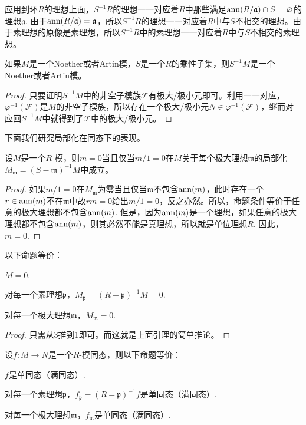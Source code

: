 应用到环$R$的理想上面，$S^{-1}R$的理想一一对应着$R$中那些满足$\operatorname{ann}(R/\mathfrak{a})\cap S=\varnothing$的理想$\mathfrak{a}$. 由于$\operatorname{ann}(R/\mathfrak{a})=\mathfrak{a}$，所以$S^{-1}R$的理想一一对应着$R$中与$S$不相交的理想。由于素理想的原像是素理想，所以$S^{-1}R$中的素理想一一对应着$R$中与$S$不相交的素理想。

\begin{pro}
如果$M$是一个Noether或者Artin模，$S$是一个$R$的乘性子集，则$S^{-1}M$是一个Noether或者Artin模。
\end{pro}

\begin{proof}
	只要证明$S^{-1}M$中的非空子模族$\mathcal{F}$有极大/极小元即可。利用一一对应，$\varphi^{-1}(\mathcal{F})$是$M$的非空子模族，所以存在一个极大/极小元$N\in \varphi^{-1}(\mathcal{F})$，继而对应回$S^{-1}M$中就得到了$\mathcal{F}$中的极大/极小元。
\end{proof}

下面我们研究局部化在同态下的表现。

\begin{lem}
设$M$是一个$R$-模，则$m=0$当且仅当$m/1=0$在$M$关于每个极大理想$\mathfrak m$的局部化$M_{\mathfrak m}=(S-\mathfrak m)^{-1}M$中成立。
\end{lem}

\begin{proof}
	如果$m/1=0$在$M_{\mathfrak m}$为零当且仅当$\mathfrak m$不包含$\operatorname{ann}(m)$，此时存在一个$r\in \operatorname{ann}(m)$不在$\mathfrak m$中故$rm=0$给出$m/1=0$，反之亦然。所以，命题条件等价于任意的极大理想都不包含$\operatorname{ann}(m)$. 但是，因为$\operatorname{ann}(m)$是一个理想，如果任意的极大理想都不包含$\operatorname{ann}(m)$，则其必然不能是真理想，所以就是单位理想$R$. 因此，$m=0$.
\end{proof}

\begin{pro}\label{pro:3.5.22}
以下命题等价：
\begin{compactenum}
	\item $M=0$.
	\item 对每一个素理想$\mathfrak{p}$，$M_{\mathfrak{p}}=(R-\mathfrak{p})^{-1}M=0$.
	\item 对每一个极大理想$\mathfrak{m}$，$M_{\mathfrak{m}}=0$.
\end{compactenum}
\end{pro}

\begin{proof}
	只需从3推到1即可。而这就是上面引理的简单推论。
\end{proof}

\begin{pro}
设$f:M\to N$是一个$R$-模同态，则以下命题等价：
\begin{compactenum}
	\item $f$是单同态（满同态）.
	\item 对每一个素理想$\mathfrak{p}$，$f_{\mathfrak{p}}=(R-\mathfrak{p})^{-1}f$是单同态（满同态）.
	\item 对每一个极大理想$\mathfrak{m}$，$f_{\mathfrak{m}}$是单同态（满同态）.
\end{compactenum}
\end{pro}

